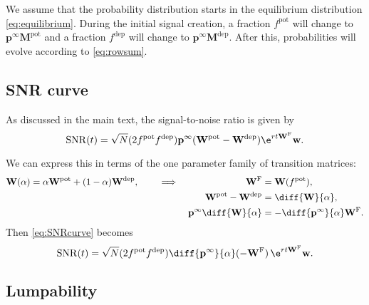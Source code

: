 \documentclass{article} %
\DeclareMathOperator{\SNR}{SNR}
\newcommand{\pr}{\mathbf{p}}
\newcommand{\eq}{\pr^\infty}
\newcommand{\w}{\mathbf{w}}
\newcommand{\W}{\mathbf{W}}
\newcommand{\M}{\mathbf{M}}
\newcommand{\frg}{\W^{\mathrm{F}}}
\newcommand{\pot}{^{\text{pot}}}
\newcommand{\dep}{^{\text{dep}}}
\begin{document}
We assume that the probability distribution starts in the equilibrium distribution \eqref{eq:equilibrium}.
During the initial signal creation, a fraction $f\pot$ will change to $\eq\M\pot$ and a fraction $f\dep$ will change to $\eq\M\dep$.
After this, probabilities will evolve according to \eqref{eq:rowsum}.

\subsection{SNR curve}\label{sec:SNRcurve}

As discussed in the main text, the signal-to-noise ratio is given by
%
\begin{equation}\label{eq:SNRcurve}
  \SNR(t) = \sqrt{N} (2f\pot f\dep ) \eq (\W\pot  - \W\dep )\e^{rt\frg}\w.
\end{equation}
%

We can express this in terms of the one parameter family of transition matrices:
%
\begin{equation}\label{eq:Walpha}
  \begin{aligned}
  \W(\alpha) &= \alpha\W\pot +(1-\alpha)\W\dep ,
  &\quad&\implies&
    \frg&=\W(f\pot ),\\&&&&
    \W\pot  - \W\dep  &= \diff{\W}{\alpha},\\&&&&
    \eq \diff{\W}{\alpha} &= -\diff{\eq}{\alpha} \frg.
  \end{aligned}
\end{equation}
%
Then \eqref{eq:SNRcurve} becomes
%
\begin{equation}\label{eq:SNRalpha}
  \SNR(t) = \sqrt{N} (2f\pot f\dep ) \diff{\eq}{\alpha}(-\frg)\,\e^{rt\frg}\w.
\end{equation}
%




\subsection{Lumpability}\label{sec:SNRlump}
\end{document}
